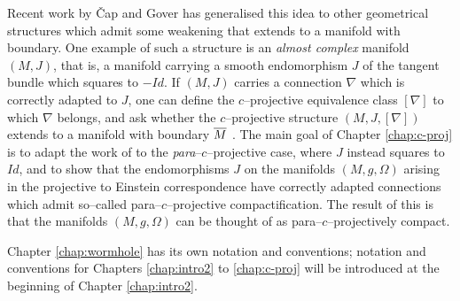 Recent work by \v Cap and Gover \cite{CG0,CG} has generalised this idea to other geometrical structures which admit some weakening that extends to a manifold with boundary. One example of such a structure is an \textit{almost complex} manifold $(M,J)$, that is, a manifold carrying a smooth endomorphism $J$ of the tangent bundle which squares to $-Id$. If $(M,J)$ carries a connection $\nabla$ which is correctly adapted to $J$, one can define the $c$--projective equivalence class $[\nabla]$ to which $\nabla$ belongs, and ask whether the $c$--projective structure $(M,J,[\nabla])$ extends to a manifold with boundary $\overline{M}$ \cite{CG}. The main goal of Chapter \ref{chap:c-proj} is to adapt the work of \cite{CG} to the \textit{para}--$c$--projective case, where $J$ instead squares to $Id$, and to show that the endomorphisms $J$ on the manifolds $(M,g,\Omega)$ arising in the projective to Einstein correspondence have correctly adapted connections which admit so--called para--$c$--projective compactification. The result of this is that the manifolds $(M,g,\Omega)$ can be thought of as para--$c$--projectively compact.

Chapter \ref{chap:wormhole} has its own notation and conventions; notation and conventions for Chapters \ref{chap:intro2} to \ref{chap:c-proj} will be introduced at the beginning of Chapter \ref{chap:intro2}.






